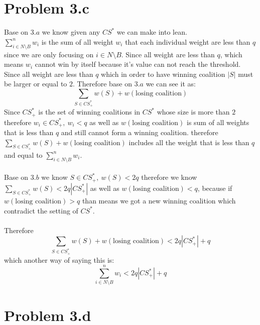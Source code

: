 \documentclass{article}
\begin{document}
\section{Problem 3.c}
Base on $3.a$ we know given any $CS^*$ we can make into lean.\\
$\sum_{i\in N \setminus B}^{n} w_i$ is the sum of all weight $w_i$ that each individual weight are less than $q$ since we are only focusing on $i \in N \setminus B$. Since all weight are less than $q$, which means $w_i$ cannot win by itself because it's value can not reach the threshold. Since all weight are less than $q$ which in order to have winning coalition $|S|$ must be larger or equal to $2$. Therefore base on $3.a$ we can see it as: $$\sum_{S \in CS^*_+} w(S) + w(\text{losing coalition})$$
Since $CS^*_+$ is the set of winning coalitions in $CS^*$ whose size is more than $2$ therefore $w_i \in CS^*_+,\ w_i < q$ as well as $w(\text{losing coalition})$ is sum of all weights that is less than $q$ and still cannot form a winning coalition. therefore $\sum_{S \in CS^*_+} w(S) + w(\text{losing coalition})$ includes all the weight that is less than $q$ and equal to $\sum_{i\in N \setminus B}^{n} w_i$.\\\\
Base on $3.b$ we know $S\in CS^*_+,\ w(S) < 2q$ therefore we know $\sum_{S \in CS^*_+} w(S) < 2q|CS^*_+|$ as well as $w(\text{losing coalition}) < q$, because if $w(\text{losing coalition}) > q$ than means we got a new winning coalition which contradict the setting of $CS^*$.\\\\
Therefore $$\sum_{S \in CS^*_+} w(S) + w(\text{losing coalition}) < 2q|CS^*_+| + q$$ which another way of saying this is:
$$\sum_{i\in N \setminus B}^{n} w_i < 2q|CS^*_+| + q$$

\newpage
\section{Problem 3.d}
\end{document}

